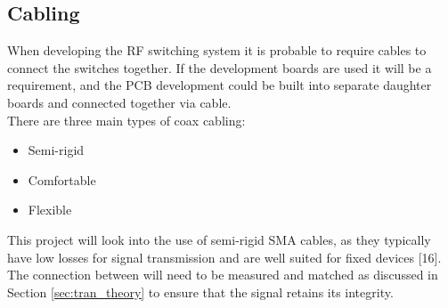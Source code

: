 \documentclass[12pt,openany,a4paper]{book}
\begin{document}
\subsection{Cabling}
When developing the RF switching system it is probable to require cables to connect the switches together. If the development boards are used it will be a requirement, and the PCB development could be built into separate daughter boards and connected together via cable. \\
There are three main types of coax cabling:\\[-0.8cm]
\begin{itemize}
	\setlength\itemsep{-0.5em}
	\item Semi-rigid
	\item Comfortable
	\item Flexible
\end{itemize}
This project will look into the use of semi-rigid SMA cables, as they typically have low losses for signal transmission and are well suited for fixed devices [16]. The connection between will need to be measured and matched as discussed in Section \ref{sec:tran_theory} to ensure that the signal retains its integrity.
\end{document}
